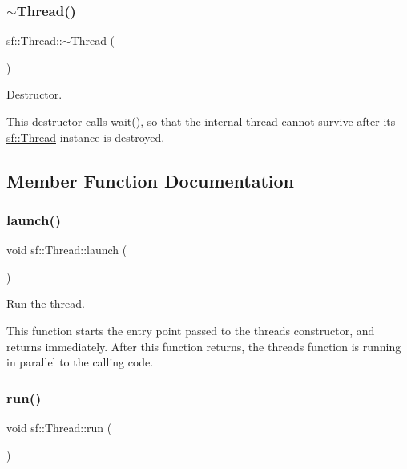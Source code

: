 \subsubsection{\texorpdfstring{$\sim$Thread()}{~Thread()}}
{\footnotesize\ttfamily sf\+::\+Thread\+::$\sim$\+Thread (\begin{DoxyParamCaption}{ }\end{DoxyParamCaption})}



Destructor. 

This destructor calls \mbox{\hyperlink{classsf_1_1_thread_a724b1f94c2d54f84280f2f78bde95fa0}{wait()}}, so that the internal thread cannot survive after its \mbox{\hyperlink{classsf_1_1_thread}{sf\+::\+Thread}} instance is destroyed. \begin{DoxyVerb}\end{DoxyVerb}
 

\subsection{Member Function Documentation}
\mbox{\label{classsf_1_1_thread_a74f75a9e86e1eb47479496314048b5f6}} 
\subsubsection{\texorpdfstring{launch()}{launch()}}
{\footnotesize\ttfamily void sf\+::\+Thread\+::launch (\begin{DoxyParamCaption}{ }\end{DoxyParamCaption})}



Run the thread. 

This function starts the entry point passed to the thread\textquotesingle{}s constructor, and returns immediately. After this function returns, the thread\textquotesingle{}s function is running in parallel to the calling code. \begin{DoxyVerb}\end{DoxyVerb}
 \mbox{\label{classsf_1_1_thread_a593508379bd38e0b42ebf9f5a7e2829c}} 
\subsubsection{\texorpdfstring{run()}{run()}}
{\footnotesize\ttfamily void sf\+::\+Thread\+::run (\begin{DoxyParamCaption}{ }\end{DoxyParamCaption})\hspace{0.3cm}{\ttfamily [private]}}



